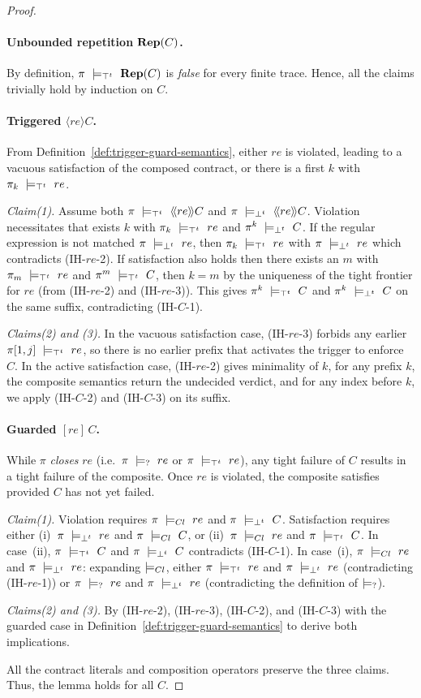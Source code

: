 \begin{proof}
\paragraph{Unbounded repetition $\mathbf{Rep}(C)$.}
By definition, $\pi\ \satt\ \repit{C}$ is \emph{false} for every finite trace. Hence, all the claims trivially hold by induction on $C$.

\paragraph{Triggered $\langle re\rangle C$.}
From Definition~\ref{def:trigger-guard-semantics}, either $re$ is violated, leading to a vacuous satisfaction of the composed contract, or there is a first $k$ with $\pi_k\ \models_{\top^t}\ re$.

\emph{Claim(1).} Assume both $\pi\ \satt\ \trig[re]{C}$ and $\pi\ \violt\ \trig[re]{C}$.
Violation necessitates that exists $k$ with $\pi_k\ \models_{\top^t}\ re$ and $\pi^{k}\ \models_{\bot^t}\ C$.
If the regular expression is not matched $\pi\ \violt\ re$, then $\pi_k\ \models_{\top^t}\ re$ with $\pi\ \violt\ re$ which contradicts (IH-$re$-2).
If satisfaction also holds then there exists an $m$ with $\pi_m\ \models_{\top^t}\ re$ and $\pi^{m}\ \models_{\top^t}\ C$, then $k = m$ by the uniqueness of the tight frontier for $re$ (from (IH-$re$-2) and (IH-$re$-3)).
This gives $\pi^{k}\ \models_{\top^t}\ C$ and $\pi^{k}\ \models_{\bot^t}\ C$ on the same suffix, contradicting (IH-$C$-1).

\emph{Claims(2) and (3).}
In the vacuous satisfaction case, (IH-$re$-3) forbids any earlier $\pi[1,j]\ \satt\ re$, so there is no earlier prefix that activates the trigger to enforce $C$.
In the active satisfaction case, (IH-$re$-2) gives minimality of $k$, for any prefix $k$, the composite semantics return the undecided verdict, and for any index before $k$, we apply (IH-$C$-2) and (IH-$C$-3) on its suffix.

\paragraph{Guarded $[re]\,C$.}
While $\pi$ \emph{closes} $re$ (i.e.\ $\pi\ \models_{?}\ re$ or $\pi\ \models_{\top^t}\ re$), any tight failure of $C$ results in a tight failure of the composite.
Once $re$ is violated, the composite satisfies provided $C$ has not yet failed.

\emph{Claim(1).}
Violation requires $\pi\ \clossat\ re$ and $\pi\ \violt\ C$.
Satisfaction requires either (i)~$\pi\ \violt\ re$ and $\pi\ \models_{Cl}\ C$, or (ii)~$\pi\ \clossat\ re$ and $\pi\ \models_{\top^t}\ C$.
In case~(ii), $\pi\ \models_{\top^t}\ C$ and $\pi\ \violt\ C$ contradicts (IH-$C$-1).
In case~(i), $\pi\ \clossat\ re$ and $\pi\ \violt\ re$:
expanding $\models_{Cl}$, either $\pi\ \models_{\top^t}\ re$ and $\pi\ \violt\ re$ (contradicting (IH-$re$-1)) or $\pi\ \models_{?}\ re$ and $\pi\ \violt\ re$ (contradicting the definition of $\models_{?}$).

\emph{Claims(2) and (3).}
By (IH-$re$-2), (IH-$re$-3), (IH-$C$-2), and (IH-$C$-3) with the guarded case in Definition~\ref{def:trigger-guard-semantics} to derive both implications.

\medskip
All the contract literals and composition operators preserve the three claims. Thus, the lemma holds for all $C$.
\end{proof}

